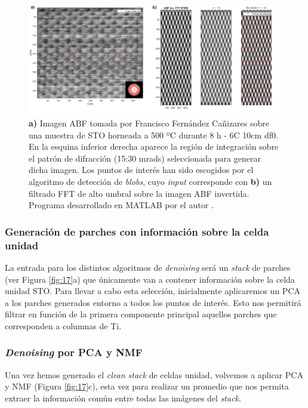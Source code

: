 \begin{figure}[h!]
    \centering
    \includegraphics[width=1\textwidth]{fig/Fig16.png}
    \caption{\textbf{a)} Imagen ABF tomada por Francisco Fernández Cañizares sobre una muestra de STO horneada a 500 ºC durante 8 h - 6C 10cm df0. En la esquina inferior derecha aparece la región de integración sobre el patrón de difracción (15:30 mrads) seleccionada para generar dicha imagen. Los puntos de interés han sido escogidos por el algoritmo de detección de \textit{blobs}, cuyo \textit{input} corresponde con \textbf{b)} un filtrado FFT de alto umbral sobre la imagen ABF invertida. Programa desarrollado en MATLAB por el autor \cite{repo}.}
    \label{fig:16}
\end{figure}

\subsubsection{Generación de parches con información sobre la celda unidad}

La entrada para los distintos algoritmos de \textit{denoising} será un \textit{stack} de parches (ver Figura \ref{fig:17}a) que únicamente van a contener información sobre la celda unidad STO. Para llevar a cabo esta selección, inicialmente aplicaremos un PCA a los parches generados entorno a todos los puntos de interés. Esto nos permitirá filtrar en función de la primera componente principal aquellos parches que corresponden a columnas de Ti.\\

\subsubsection{\textit{Denoising} por PCA y NMF}
Una vez hemos generado el \textit{clean stack} de celdas unidad, volvemos a aplicar PCA y NMF (Figura \ref{fig:17}c), esta vez para realizar un promedio que nos permita extraer la información común entre todas las imágenes del \textit{stack}.

